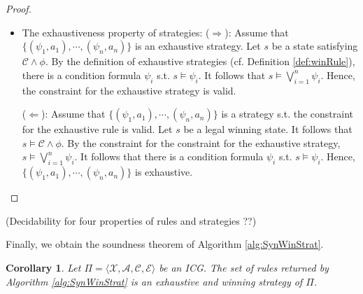 \documentclass[review]{elsarticle}
\newcommand{\set}[1]{\{ #1 \}}
\newcommand{\tuple}[1]{\langle {#1} \rangle}
\newcommand{\statevar}{\mathcal{X}}
\newcommand{\act}{\mathcal{A}}
\newcommand{\constraint}{\mathcal{C}}
\newcommand{\estate}{\mathcal{E}}
\newtheorem{corollary}{Corollary}
\begin{document}
\begin{proof}
\begin{itemize}
		\item The exhaustiveness property of strategies: ($\Rightarrow$): Assume that $\{(\psi_1, a_1), \cdots, (\psi_n, a_n)\}$ is an exhaustive strategy.
		Let $s$ be a state satisfying $\constraint \land \phi$.
		By the definition of exhaustive strategies (cf. Definition \ref{def:winRule}), there is a condition formula $\psi_i$ s.t. $s \models \psi_i$.
		It follows that $s \models \bigvee_{i = 1}^n \psi_i$.
		Hence, the constraint for the exhaustive strategy is valid.
				
		
		($\Leftarrow$): Assume that $\set{(\psi_1, a_1), \cdots, (\psi_n, a_n)}$ is a strategy s.t. the constraint for the exhaustive rule is valid.
		Let $s$ be a legal winning state. %
		It follows that $s \models \constraint \land \phi$.
		By the constraint for the constraint for the exhaustive strategy, $s \models \bigvee_{i = 1}^n \psi_i$.
		It follows that there is a condition formula $\psi_i$ s.t. $s \models \psi_i$.	
		Hence, $\set{(\psi_1, a_1), \cdots, (\psi_n, a_n)}$ is exhaustive.
	\end{itemize}	
\end{proof}


(Decidability for four properties of rules and strategies ??)

Finally, we obtain the soundness theorem of Algorithm \ref{alg:SynWinStrat}.

\begin{corollary} \label{cor:winStr}
	Let $\Pi = \tuple{\statevar, \act, \constraint, \estate}$ be an ICG.
	The set of rules returned by Algorithm \ref{alg:SynWinStrat} is an exhaustive and winning strategy of $\Pi$.
\end{corollary}
\end{document}
